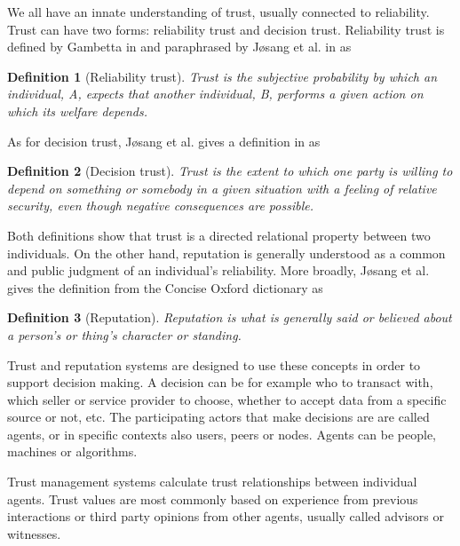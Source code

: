 \documentclass[%
    ]{\PathToTumTemplate/thesis/tum_thesis}
\newtheorem{definition}{Definition}[chapter]
\begin{document}

We all have an innate understanding of trust, usually connected to reliability.
Trust can have two forms: reliability trust and decision trust\cite{josang_trust_2007,josang_survey_2017}.
Reliability trust is defined by Gambetta in \cite{gambetta_can_2000} and paraphrased by Jøsang et al. in \cite{josang_survey_2017} as
\begin{definition}[Reliability trust]
Trust is the subjective probability by which an individual, A, expects that another individual, B, performs a given action on which its welfare depends.
\end{definition}

As for decision trust, Jøsang et al. gives a definition in \cite{josang_survey_2017} as
\begin{definition}[Decision trust]
Trust is the extent to which one party is willing to depend on something or somebody in a given situation with a feeling of relative security, even though negative consequences are possible.
\end{definition}

Both definitions show that trust is a directed relational property between two individuals.
On the other hand, reputation is generally understood as a common and public judgment of an individual's reliability.
More broadly, Jøsang et al. gives the definition from the Concise Oxford dictionary as
\begin{definition}[Reputation]
Reputation is what is generally said or believed about a person’s or thing’s character or standing.
\end{definition}

Trust and reputation systems are designed to use these concepts in order to support decision making.
A decision can be for example who to transact with, which seller or service provider to choose, whether to accept data from a specific source or not, etc.
The participating actors that make decisions are are called agents, or in specific contexts also users, peers or nodes.
Agents can be people, machines or algorithms.

Trust management systems calculate trust relationships between individual agents.
Trust values are most commonly based on experience from previous interactions or third party opinions from other agents, usually called advisors or witnesses.
\end{document}

